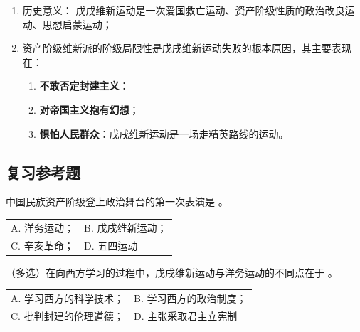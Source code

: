 \documentclass[10pt, UTF8]{book} %
\begin{document}
\begin{mdframed}[frametitle={戊戌维新：中国民族资产阶级的第一舞}]
    \begin{enumerate}[label=\textup{\arabic*}${}^\circ$, itemsep=0pt]
        \item 历史意义：
        戊戌维新运动是一次爱国救亡运动、资产阶级性质的政治改良运动、思想启蒙运动；
        \item 资产阶级维新派的阶级局限性是戊戌维新运动失败的根本原因，其主要表现在：
        \begin{enumerate}[label=\roman*., itemsep=0pt]
            \item \textbf{不敢否定封建主义}：
            \item \textbf{对帝国主义抱有幻想}；
            \item \textbf{惧怕人民群众}：戊戌维新运动是一场走精英路线的运动。
       \end{enumerate}
    \end{enumerate}
\end{mdframed}

\subsection{复习参考题}

\begin{example}
    中国民族资产阶级登上政治舞台的第一次表演是 \underline{\qquad \qquad \qquad}。
    \newline
    \begin{tabular}{p{} p{}}
    A. 洋务运动； & B. 戊戌维新运动； \\
    C. 辛亥革命； & D. 五四运动 
    \end{tabular}
\end{example}

\begin{example}
    （多选）在向西方学习的过程中，戊戌维新运动与洋务运动的不同点在于 \underline{\qquad \qquad \qquad}。
    \newline
    \begin{tabular}{p{} p{}}
        A. 学习西方的科学技术；& B. 学习西方的政治制度； \\ 
        C. 批判封建的伦理道德；& D. 主张采取君主立宪制
    \end{tabular}
\end{example}

\end{document}
